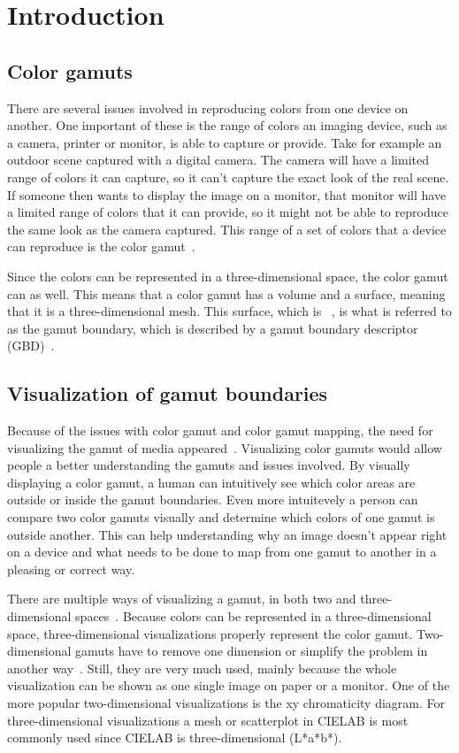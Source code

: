 \section{Introduction}

\subsection{Color gamuts}
There are several issues involved in reproducing colors from one device on another.
One important of these is the range of colors an imaging device, such as a camera, printer or monitor, is able to capture or provide.
Take for example an outdoor scene captured with a digital camera.
The camera will have a limited range of colors it can capture, so it can't capture the exact look of the real scene.
If someone then wants to display the image on a monitor, that monitor will have a limited range of colors that it can provide, so it might not be able to reproduce the same look as the camera captured.
This range of a set of colors that a device can reproduce is the color gamut~\cite{GamutMapping,HandbookGamutMapping}.

Since the colors can be represented in a three-dimensional space, the color gamut can as well.
This means that a color gamut has a volume and a surface, meaning that it is a three-dimensional mesh.
This surface, which is ~\cite{ColourImageScience}, is what is referred to as the gamut boundary, which is described by a gamut boundary descriptor (GBD)~\cite{HandbookGamutMapping}.

\subsection{Visualization of gamut boundaries}
\label{sec:intro-gbd-viz}
Because of the issues with color gamut and color gamut mapping, the need for visualizing the gamut of media appeared~\cite{InteractiveGamutMapping}.
Visualizing color gamuts would allow people a better understanding the gamuts and issues involved.
By visually displaying a color gamut, a human can intuitively see which color areas are outside or inside the gamut boundaries.
Even more intuitevely a person can compare two color gamuts visually and determine which colors of one gamut is outside another.
This can help understanding why an image doesn't appear right on a device and what needs to be done to map from one gamut to another in a pleasing or correct way.

There are multiple ways of visualizing a gamut, in both two and three-dimensional spaces~\cite{ColourImaging,InteractiveGamutMapping}.
Because colors can be represented in a three-dimensional space, three-dimensional visualizations properly represent the color gamut.
Two-dimensional gamuts have to remove one dimension or simplify the problem in another way~\cite{InteractiveGamutMapping}.
Still, they are very much used, mainly because the whole visualization can be shown as one single image on paper or a monitor.
One of the more popular two-dimensional visualizations is the xy chromaticity diagram.
For three-dimensional visualizations a mesh or scatterplot in CIELAB is most commonly used since CIELAB is three-dimensional (L*a*b*).

